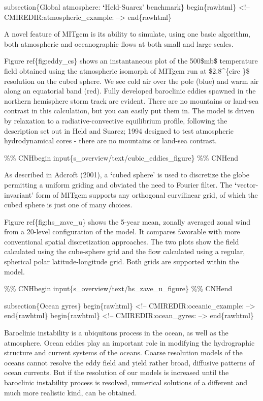 \documentclass[letterpaper,10pt,english]{sphinxmanual}
\begin{document}
subsection\{Global atmosphere: {\color{red}\bfseries{}{}`}Held-Suarez' benchmark\}
begin\{rawhtml\}
\textless{}!-- CMIREDIR:atmospheric\_example: --\textgreater{}
end\{rawhtml\}

A novel feature of MITgcm is its ability to simulate, using one basic algorithm,
both atmospheric and oceanographic flows at both small and large scales.

Figure ref\{fig:eddy\_cs\} shows an instantaneous plot of the 500\$mb\$
temperature field obtained using the atmospheric isomorph of MITgcm run at
\$2.8\textasciicircum{}\{circ \}\$ resolution on the cubed sphere. We see cold air over the pole
(blue) and warm air along an equatorial band (red). Fully developed
baroclinic eddies spawned in the northern hemisphere storm track are
evident. There are no mountains or land-sea contrast in this calculation,
but you can easily put them in. The model is driven by relaxation to a
radiative-convective equilibrium profile, following the description set out
in Held and Suarez; 1994 designed to test atmospheric hydrodynamical cores -
there are no mountains or land-sea contrast.

\%\% CNHbegin
input\{s\_overview/text/cubic\_eddies\_figure\}
\%\% CNHend

As described in Adcroft (2001), a {\color{red}\bfseries{}{}`}cubed sphere' is used to discretize the
globe permitting a uniform griding and obviated the need to Fourier filter.
The {\color{red}\bfseries{}{}`}vector-invariant' form of MITgcm supports any orthogonal curvilinear
grid, of which the cubed sphere is just one of many choices.

Figure ref\{fig:hs\_zave\_u\} shows the 5-year mean, zonally averaged zonal
wind from a 20-level configuration of
the model. It compares favorable with more conventional spatial
discretization approaches. The two plots show the field calculated using the
cube-sphere grid and the flow calculated using a regular, spherical polar
latitude-longitude grid. Both grids are supported within the model.

\%\% CNHbegin
input\{s\_overview/text/hs\_zave\_u\_figure\}
\%\% CNHend

subsection\{Ocean gyres\}
begin\{rawhtml\}
\textless{}!-- CMIREDIR:oceanic\_example: --\textgreater{}
end\{rawhtml\}
begin\{rawhtml\}
\textless{}!-- CMIREDIR:ocean\_gyres: --\textgreater{}
end\{rawhtml\}

Baroclinic instability is a ubiquitous process in the ocean, as well as the
atmosphere. Ocean eddies play an important role in modifying the
hydrographic structure and current systems of the oceans. Coarse resolution
models of the oceans cannot resolve the eddy field and yield rather broad,
diffusive patterns of ocean currents. But if the resolution of our models is
increased until the baroclinic instability process is resolved, numerical
solutions of a different and much more realistic kind, can be obtained.
\end{document}
